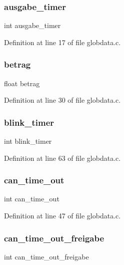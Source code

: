 \subsubsection{ausgabe\+\_\+timer}
{\footnotesize\ttfamily int ausgabe\+\_\+timer}



Definition at line 17 of file globdata.\+c.

\mbox{\label{globdata_8h_ad31566d70fbfc66ff793c1e57e0c5d16}} 
\subsubsection{betrag}
{\footnotesize\ttfamily float betrag}



Definition at line 30 of file globdata.\+c.

\mbox{\label{globdata_8h_a2742d4e5d56ebc0fc66ae7facbae0389}} 
\subsubsection{blink\+\_\+timer}
{\footnotesize\ttfamily int blink\+\_\+timer}



Definition at line 63 of file globdata.\+c.

\mbox{\label{globdata_8h_aa1904e43b1fd8d42d624b4be10661993}} 
\subsubsection{can\+\_\+time\+\_\+out}
{\footnotesize\ttfamily int can\+\_\+time\+\_\+out}



Definition at line 47 of file globdata.\+c.

\mbox{\label{globdata_8h_a268db3f67d10f87e9174fd110eedb77a}} 
\subsubsection{can\+\_\+time\+\_\+out\+\_\+freigabe}
{\footnotesize\ttfamily int can\+\_\+time\+\_\+out\+\_\+freigabe}



